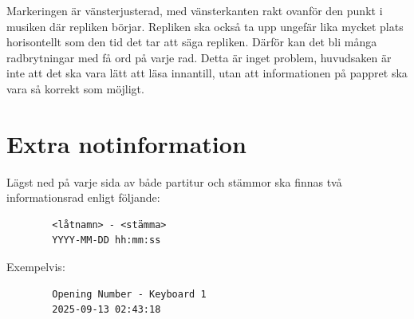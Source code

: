 Markeringen är vänsterjusterad, med vänsterkanten rakt ovanför den punkt i musiken där repliken börjar. Repliken ska också ta upp ungefär lika mycket plats horisontellt som den tid det tar att säga repliken. Därför kan det bli många radbrytningar med få ord på varje rad. Detta är inget problem, huvudsaken är inte att det ska vara lätt att läsa innantill, utan att informationen på pappret ska vara så korrekt som möjligt.

\newpage
\section{Extra notinformation}
Lägst ned på varje sida av både partitur och stämmor ska finnas två informationsrad enligt följande:
\begin{center}
    \begin{verbatim}
        <låtnamn> - <stämma>
        YYYY-MM-DD hh:mm:ss
    \end{verbatim}
\end{center}
Exempelvis:
\begin{center}
    \begin{verbatim}
        Opening Number - Keyboard 1
        2025-09-13 02:43:18
    \end{verbatim}
\end{center}
